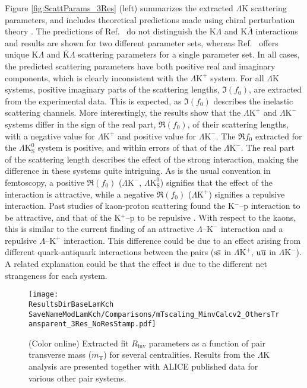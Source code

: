 \documentclass[ALICE,manyauthors]{cernphprep}
\newcommand{\ResultsDirBaseLamKch}{/home/jesse/Analysis/FemtoAnalysis/Results/Results_cLamcKch_20190319/}
\newcommand{\MomRes}{_MomResCrctn}%
\newcommand{\NonFlatBgdLamKch}{_NonFlatBgdCrctnLamK0LamKchPolynomial}
\newcommand{\ResNum}{_3Res}
\newcommand{\PrimMaxDecay}{_PrimMaxDecay10fm}
\newcommand{\ResMethod}{_UsingXiDataAndCoulombOnly}
\newcommand{\ParamFixAndShareLamKch}{_ShareLam_Dualie_ShareLam_ShareRadii}
\newcommand{\SaveNameModLamKch}{\MomRes\NonFlatBgdLamKch\ResNum\PrimMaxDecay\ResMethod\ParamFixAndShareLamKch}
\newcommand{\mt}{$m_{\mathrm{T}}$\xspace}
\newcommand{\Lam}{$\Lambda$\xspace}
\newcommand{\ALam}{$\overline{\Lambda}$\xspace}
\newcommand{\KchP}{$\mathrm{K^{+}}$\xspace}
\newcommand{\KchM}{$\mathrm{K^{-}}$\xspace}
\newcommand{\LamK}{$\Lambda$K\xspace}
\newcommand{\LamKchP}{$\Lambda\mathrm{K^{+}}$\xspace}
\newcommand{\LamKchM}{$\Lambda\mathrm{K^{-}}$\xspace}
\newcommand{\LamKs}{$\Lambda\mathrm{K^{0}_{S}}$\xspace}
\begin{document}
Figure \ref{fig:ScattParams_3Res} (left) summarizes the extracted \LamK scattering parameters, and includes theoretical predictions made using chiral perturbation theory \cite{Liu:2006xja,Mai:2009ce}.
The predictions of Ref.\ \cite{Liu:2006xja} do not distinguish the K\Lam and K\ALam interactions and results are shown for two different parameter sets, whereas Ref.\ \cite{Mai:2009ce} offers unique K\Lam and $\overline{\mathrm{K}}$\Lam scattering parameters for a single parameter set. 
In all cases, the predicted scattering parameters have both positive real and imaginary components, which is clearly inconsistent with the \LamKchP system.
For all \LamK systems, positive imaginary parts of the scattering lengths, $\Im(f_{0})$, are extracted from the experimental data. 
This is expected, as $\Im(f_{0})$ describes the inelastic scattering channels.
More interestingly, the results show that the \LamKchP and \LamKchM systems differ in the sign of the real part, $\Re(f_{0})$, of their scattering lengths, with a negative value for \LamKchP and positive value for \LamKchM.
The $\Re f_{0}$ extracted for the \LamKs system is positive, and within errors of that of the \LamKchM. 
The real part of the scattering length describes the effect of the strong interaction, making the difference in these systems quite intriguing.
As is the usual convention in femtoscopy, a positive $\Re(f_{0})$ (\LamKchM, \LamKs) signifies that the effect of the interaction is attractive, while a negative $\Re(f_{0})$ (\LamKchP) signifies a repulsive interaction.
Past studies of kaon-proton scattering found the K$^{-}$--p interaction to be attractive, and that of the K$^{+}$--p to be repulsive \cite{Humphrey:1962zz, Hadjimichef:2002xe, Ikeda:2012au}.
With respect to the kaons, this is similar to the current finding of an attractive \Lam--\KchM interaction and a repulsive \Lam--\KchP interaction.
This difference could be due to an effect arising from different quark-antiquark interactions between the pairs ($\rm s\overline{s}$ in \LamKchP, $\rm u\overline{u}$ in \LamKchM).
A related explanation could be that the effect is due to the different net strangeness for each system.


\begin{figure}[h]
  \centering
  \texttt{[image: \\ResultsDirBaseLamKch\\SaveNameModLamKch/Comparisons/mTscaling\_MinvCalcv2\_OthersTransparent\_3Res\_NoResStamp.pdf]}
  \caption[\mt Scaling of Radii: 3 Residuals in Fit]
  {
  (Color online) Extracted fit $R_{\mathrm{inv}}$ parameters as a function of pair transverse mass (\mt) for several centralities.
  Results from the \LamK analysis are presented together with ALICE published data \cite{Adam:2015vja} for various other pair systems.  
  }
  \label{fig:mTScalingOfRadii_3Res}
\end{figure}
\end{document}
